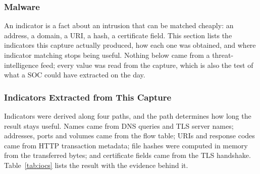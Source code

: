 \subsubsection{Malware}

An indicator is a fact about an intrusion that can be matched cheaply: an address, a domain, a URI, a hash, a certificate field. This section lists the indicators this capture actually produced, how each one was obtained, and where indicator matching stops being useful. Nothing below came from a threat-intelligence feed; every value was read from the capture, which is also the test of what a SOC could have extracted on the day.

\subsubsection{Indicators Extracted from This Capture}

Indicators were derived along four paths, and the path determines how long the result stays useful. Names came from DNS queries and TLS server names; addresses, ports and volumes came from the flow table; URIs and response codes came from HTTP transaction metadata; file hashes were computed in memory from the transferred bytes; and certificate fields came from the TLS handshake. Table~\ref{tab:iocs} lists the result with the evidence behind it.


